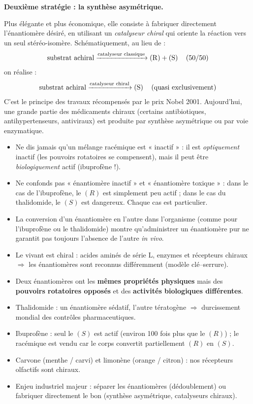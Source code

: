 \documentclass[11pt]{article}
\begin{document}
\textbf{Deuxième stratégie : la synthèse asymétrique.}\par
Plus élégante et plus économique, elle consiste à fabriquer directement l'énantiomère désiré, en utilisant un \emph{catalyseur chiral} qui oriente la réaction vers un seul stéréo-isomère. Schématiquement, au lieu de :
\[ \ce{\text{substrat achiral} ->[\text{catalyseur classique}] (R) + (S) \quad (50/50)} \]
on réalise :
\[ \ce{\text{substrat achiral} ->[\text{catalyseur chiral}] (S) \quad (\text{quasi exclusivement})} \]
C'est le principe des travaux récompensés par le prix Nobel 2001. Aujourd'hui, une grande partie des médicaments chiraux (certains antibiotiques, antihypertenseurs, antiviraux) est produite par synthèse asymétrique ou par voie enzymatique.

\begin{attention}
\begin{itemize}
\item Ne dis jamais qu'un mélange racémique est « inactif » : il est \emph{optiquement} inactif (les pouvoirs rotatoires se compensent), mais il peut être \emph{biologiquement} actif (ibuprofène !).
\item Ne confonds pas « énantiomère inactif » et « énantiomère toxique » : dans le cas de l'ibuprofène, le $(R)$ est simplement peu actif ; dans le cas du thalidomide, le $(S)$ est dangereux. Chaque cas est particulier.
\item La conversion d'un énantiomère en l'autre dans l'organisme (comme pour l'ibuprofène ou le thalidomide) montre qu'administrer un énantiomère pur ne garantit pas toujours l'absence de l'autre \emph{in vivo}.
\end{itemize}
\end{attention}

\begin{aretenir}
\begin{itemize}
\item Le vivant est chiral : acides aminés de série L, enzymes et récepteurs chiraux $\Rightarrow$ les énantiomères sont reconnus différemment (modèle clé--serrure).
\item Deux énantiomères ont les \textbf{mêmes propriétés physiques} mais des \textbf{pouvoirs rotatoires opposés} et des \textbf{activités biologiques différentes}.
\item Thalidomide : un énantiomère sédatif, l'autre tératogène $\Rightarrow$ durcissement mondial des contrôles pharmaceutiques.
\item Ibuprofène : seul le $(S)$ est actif (environ 100 fois plus que le $(R)$) ; le racémique est vendu car le corps convertit partiellement $(R)$ en $(S)$.
\item Carvone (menthe / carvi) et limonène (orange / citron) : nos récepteurs olfactifs sont chiraux.
\item Enjeu industriel majeur : séparer les énantiomères (dédoublement) ou fabriquer directement le bon (synthèse asymétrique, catalyseurs chiraux).
\end{itemize}
\end{aretenir}
\end{document}
